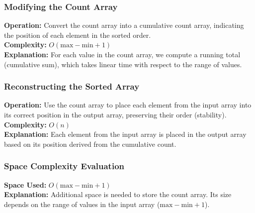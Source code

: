 \subsubsection{Modifying the Count Array}
\textbf{Operation:} Convert the count array into a cumulative count array, indicating the position of each element in the sorted order. \\
\textbf{Complexity:} \(O(\text{max} - \text{min} + 1)\) \\
\textbf{Explanation:} For each value in the count array, we compute a running total (cumulative sum), which takes linear time with respect to the range of values.

\subsubsection{Reconstructing the Sorted Array}
\textbf{Operation:} Use the count array to place each element from the input array into its correct position in the output array, preserving their order (stability). \\
\textbf{Complexity:} \(O(n)\) \\
\textbf{Explanation:} Each element from the input array is placed in the output array based on its position derived from the cumulative count.

\subsubsection{Space Complexity Evaluation}
\textbf{Space Used:} \(O(\text{max} - \text{min} + 1)\) \\
\textbf{Explanation:} Additional space is needed to store the count array. Its size depends on the range of values in the input array (\(\text{max} - \text{min} + 1\)).

